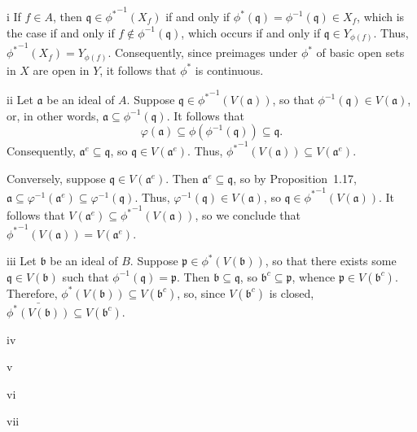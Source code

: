 \begin{partsolution}{i}
If \(f \in A\), then \(\mathfrak{q} \in {\phi^*}^{-1}(X_f)\) if and only if \(\phi^*(\mathfrak{q}) = \phi^{-1}(\mathfrak{q}) \in X_f\), which is the case if and only if \(f \notin \phi^{-1}(\mathfrak{q})\), which occurs if and only if \(\mathfrak{q} \in Y_{\phi(f)}\).
Thus, \({\phi^*}^{-1}(X_f) = Y_{\phi(f)}\).
Consequently, since preimages under \(\phi^*\) of basic open sets in \(X\) are open in \(Y\), it follows that \(\phi^*\) is continuous.
\end{partsolution}

\begin{partsolution}{ii}
Let \(\mathfrak{a}\) be an ideal of \(A\).
Suppose \(\mathfrak{q} \in {\phi^*}^{-1}(V(\mathfrak{a}))\), so that \(\phi^{-1}(\mathfrak{q}) \in V(\mathfrak{a})\), or, in other words, \(\mathfrak{a} \subseteq \phi^{-1}(\mathfrak{q})\).
It follows that
\begin{equation*}
\varphi(\mathfrak{a}) \subseteq \phi(\phi^{-1}(\mathfrak{q})) \subseteq \mathfrak{q}.
\end{equation*}
Consequently, \(\mathfrak{a}^e \subseteq \mathfrak{q}\), so \(\mathfrak{q} \in V(\mathfrak{a}^e)\).
Thus, \({\phi^*}^{-1}(V(\mathfrak{a})) \subseteq V(\mathfrak{a}^e)\).

Conversely, suppose \(\mathfrak{q} \in V(\mathfrak{a}^e)\).
Then \(\mathfrak{a}^e \subseteq \mathfrak{q}\), so by Proposition~1.17, \(\mathfrak{a} \subseteq \varphi^{-1}(\mathfrak{a}^e) \subseteq \varphi^{-1}(\mathfrak{q})\).
Thus, \(\varphi^{-1}(\mathfrak{q}) \in V(\mathfrak{a})\), so \(\mathfrak{q} \in {\phi^*}^{-1}(V(\mathfrak{a}))\).
It follows that \(V(\mathfrak{a}^e) \subseteq {\phi^*}^{-1}(V(\mathfrak{a}))\), so we conclude that \({\phi^*}^{-1}(V(\mathfrak{a})) = V(\mathfrak{a}^e)\).
\end{partsolution}

\begin{partsolution}{iii}
Let \(\mathfrak{b}\) be an ideal of \(B\).
Suppose \(\mathfrak{p} \in \phi^*(V(\mathfrak{b}))\), so that there exists some \(\mathfrak{q} \in V(\mathfrak{b})\) such that \(\phi^{-1}(\mathfrak{q}) = \mathfrak{p}\).
Then \(\mathfrak{b} \subseteq \mathfrak{q}\), so \(\mathfrak{b}^c \subseteq \mathfrak{p}\), whence \(\mathfrak{p} \in V(\mathfrak{b}^c)\).
Therefore, \(\phi^*(V(\mathfrak{b})) \subseteq V(\mathfrak{b}^c)\), so, since \(V(\mathfrak{b}^c)\) is closed, \(\bar{\phi^*(V(\mathfrak{b}))} \subseteq V(\mathfrak{b}^c)\).

\end{partsolution}

\begin{partsolution}{iv}

\end{partsolution}

\begin{partsolution}{v}

\end{partsolution}

\begin{partsolution}{vi}

\end{partsolution}

\begin{partsolution}{vii}

\end{partsolution}